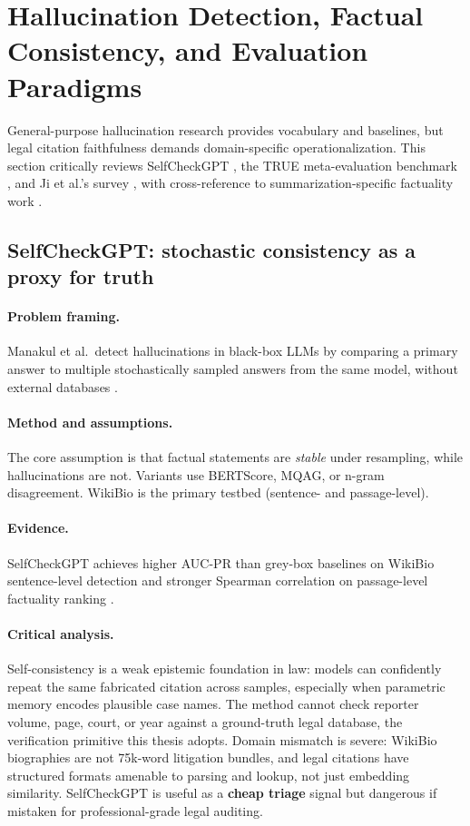 \section{Hallucination Detection, Factual Consistency, and Evaluation Paradigms}
\label{sec:lit-detection}

General-purpose hallucination research provides vocabulary and baselines, but legal citation faithfulness demands domain-specific operationalization. This section critically reviews SelfCheckGPT \cite{manakul2023selfcheckgpt}, the TRUE meta-evaluation benchmark \cite{honovich2022true}, and Ji et al.'s survey \cite{ji2023hallucinationsurvey}, with cross-reference to summarization-specific factuality work \cite{maynez2020faithfulness,pagnoni2021factuality}.

\subsection{SelfCheckGPT: stochastic consistency as a proxy for truth}
\label{sec:lit-selfcheck}

\paragraph{Problem framing.}
Manakul et al.\ detect hallucinations in black-box LLMs by comparing a primary answer to multiple stochastically sampled answers from the same model, without external databases \cite{manakul2023selfcheckgpt}.

\paragraph{Method and assumptions.}
The core assumption is that factual statements are \emph{stable} under resampling, while hallucinations are not. Variants use BERTScore, MQAG, or n-gram disagreement. WikiBio is the primary testbed (sentence- and passage-level).

\paragraph{Evidence.}
SelfCheckGPT achieves higher AUC-PR than grey-box baselines on WikiBio sentence-level detection and stronger Spearman correlation on passage-level factuality ranking \cite{manakul2023selfcheckgpt}.

\paragraph{Critical analysis.}
Self-consistency is a weak epistemic foundation in law: models can confidently repeat the same fabricated citation across samples, especially when parametric memory encodes plausible case names. The method cannot check reporter volume, page, court, or year against a ground-truth legal database, the verification primitive this thesis adopts. Domain mismatch is severe: WikiBio biographies are not 75k-word litigation bundles, and legal citations have structured formats amenable to parsing and lookup, not just embedding similarity. SelfCheckGPT is useful as a \textbf{cheap triage} signal but dangerous if mistaken for professional-grade legal auditing.

